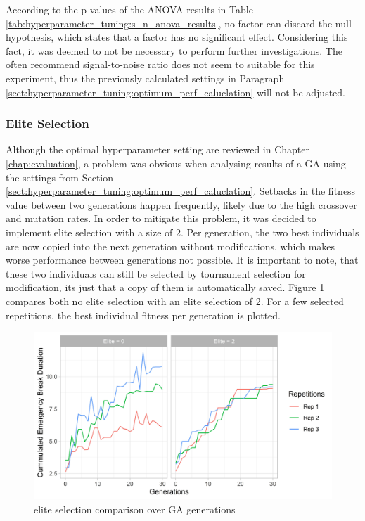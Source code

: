 According to the p values of the ANOVA results in Table \ref{tab:hyperparameter_tuning:s_n_anova_results}, no factor can discard the null-hypothesis, which states that a factor has no significant effect. Considering this fact, it was deemed to not be necessary to perform further investigations. The often recommend signal-to-noise ratio does not seem to suitable for this experiment, thus the previously calculated settings in Paragraph \ref{sect:hyperparameter_tuning:optimum_perf_caluclation} will not be adjusted.

\subsubsection{Elite Selection}
Although the optimal hyperparameter setting are reviewed in Chapter \ref{chap:evaluation}, a problem was obvious when analysing results of a GA using the settings from Section \ref{sect:hyperparameter_tuning:optimum_perf_caluclation}. Setbacks in the fitness value between two generations happen frequently, likely due to the high crossover and mutation rates. In order to mitigate this problem, it was decided to implement elite selection with a size of 2. Per generation, the two best individuals are now copied into the next generation without modifications, which makes worse performance between generations not possible. It is important to note, that these two individuals can still be selected by tournament selection for modification, its just that a copy of them is automatically saved. Figure \ref{fig:hyperparameter_tuning:elite_no_elite_comp} compares both no elite selection with an elite selection of 2. For a few selected repetitions, the best individual fitness per generation is plotted.

\begin{figure}[ht] 
	\includegraphics[width=1\linewidth]{simulations/evaluation/plots/elite_vs_no_elite_generations}
	\caption{elite selection comparison over GA generations}
	\label{fig:hyperparameter_tuning:elite_no_elite_comp}
\end{figure}

